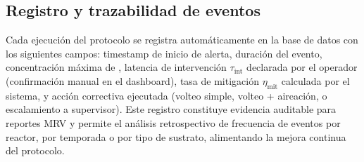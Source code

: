 \subsection{Registro y trazabilidad de eventos}
\label{subsec:cap5_registro_eventos}

Cada ejecución del protocolo se registra automáticamente en la base de datos con los siguientes campos: timestamp de inicio de alerta, duración del evento, concentración máxima de , latencia de intervención $\tau_{\text{int}}$ declarada por el operador (confirmación manual en el dashboard), tasa de mitigación $\eta_{\text{mit}}$ calculada por el sistema, y acción correctiva ejecutada (volteo simple, volteo + aireación, o escalamiento a supervisor). Este registro constituye evidencia auditable para reportes MRV y permite el análisis retrospectivo de frecuencia de eventos por reactor, por temporada o por tipo de sustrato, alimentando la mejora continua del protocolo.
